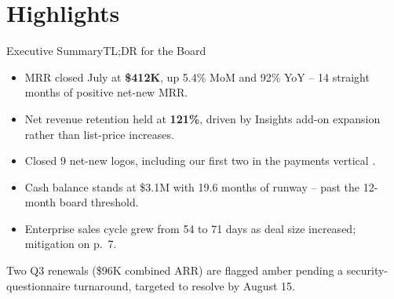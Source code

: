 \section{Highlights}

\begin{frame}{Executive Summary}{TL;DR for the Board}

  \small
  \begin{itemize}
    \setlength{\itemsep}{2pt}
    \item MRR closed July at \textbf{\textcolor{accent}{\$412K}}, up 5.4\% MoM and 92\% YoY -- 14 straight months of positive net-new MRR.
    \item Net revenue retention held at \textbf{121\%}, driven by Insights add-on expansion rather than list-price increases.
    \item Closed 9 net-new logos, including our first two in the payments vertical \cite{synapse2026reliability}.
    \item Cash balance stands at \$3.1M with 19.6 months of runway -- past the 12-month board threshold.
    \item Enterprise sales cycle grew from 54 to 71 days as deal size increased; mitigation on p.\ 7.
  \end{itemize}

  \vspace{0.02cm}
  \begin{calloutbox}[title={\textcolor{riskAmber}{\faSearch}\ \ Watch Items for the Board}]
    \scriptsize
    Two Q3 renewals (\$96K combined ARR) are flagged amber pending a security-questionnaire
    turnaround, targeted to resolve by August 15.
  \end{calloutbox}

\end{frame}
